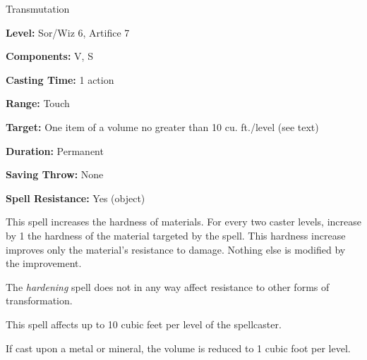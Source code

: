 
Transmutation

\textbf{Level:} Sor/Wiz 6, Artifice 7

\textbf{Components:} V, S

\textbf{Casting Time:} 1 action

\textbf{Range:} Touch

\textbf{Target:} One item of a volume no greater than 10 cu. ft./level (see text)

\textbf{Duration:} Permanent

\textbf{Saving Throw:} None

\textbf{Spell Resistance:} Yes (object)

This spell increases the hardness of materials.  For every two caster levels, increase 
by 1 the hardness of the material targeted by the spell. This hardness increase 
improves only the material's resistance to damage. Nothing else is modified by 
the improvement.

The \textit{hardening} spell does not in any way affect resistance to other forms 
of transformation. 

This spell affects up to 10 cubic feet per level of the spellcaster.

If cast upon a metal or mineral, the volume is reduced to 1 cubic foot per level.

